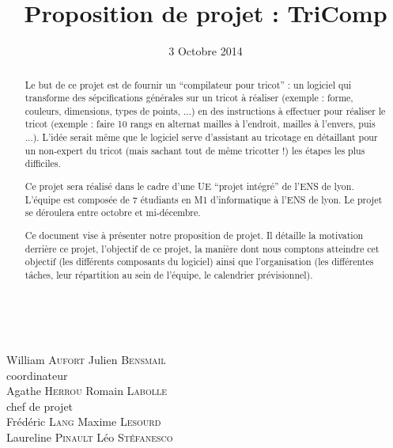 \documentclass{article}
\title{Proposition de projet : TriComp}
\author{}
\date{3 Octobre 2014}
\begin{document}
\makeatletter %
  \begin{titlepage}
    \begin{center}
       {\LARGE \@title} \\
       \vspace{2cm}
       {\large \@date}
       \vspace{3cm}
    \end{center}
       {\large
       {William \textsc{Aufort} \hfill Julien \textsc{Bensmail} \\}
	\vspace{1cm}
       {\hfill coordinateur \\}
       {Agathe \textsc{Herrou}  \hfill Romain \textsc{Labolle} \\}
       \vspace{1cm}
       {chef de projet \\}
       \vspace{1.5cm}
       {Frédéric \textsc{Lang} \hfill Maxime \textsc{Lesourd} \\}
       {Laureline \textsc{Pinault} \hfill Léo \textsc{Stéfanesco} \\}}
       \vspace{2.5cm}
       \begin{abstract}
  Le but de ce projet est de fournir un ``compilateur pour tricot'' : un logiciel qui transforme des sépcifications générales sur un tricot à réaliser (exemple : forme, couleurs, dimensions, types de points, ...) en des instructions à effectuer pour réaliser le tricot (exemple : faire 10 rangs en alternat mailles à l'endroit, mailles à l'envers, puis ...). L'idée serait même que le logiciel serve d'assistant au tricotage en détaillant pour un non-expert du tricot (mais sachant tout de même tricotter !) les étapes les plus difficiles.
  
  Ce projet sera réalisé dans le cadre d'une UE ``projet intégré'' de l'ENS de lyon. L'équipe est composée de 7 étudiants en M1 d'informatique à l'ENS de lyon. Le projet se déroulera entre octobre et mi-décembre.
  
  Ce document vise à présenter notre proposition de projet. Il détaille la motivation derrière ce projet, l'objectif de ce projet, la manière dont nous comptons atteindre cet objectif (les différents composants du logiciel) ainsi que l'organisation (les différentes tâches, leur répartition au sein de l'équipe, le calendrier prévisionnel).
      \end{abstract}
  \end{titlepage}
\makeatother
\end{document}
